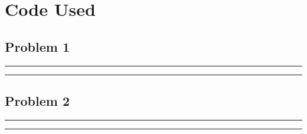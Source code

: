 \documentclass[a4paper,12pt]{article}
\begin{document}
\newpage
\section*{Code Used}
\subsection*{Problem 1}
\rule{\textwidth}{4pt}
	
\rule{\textwidth}{4pt}

\newpage
\subsection*{Problem 2}
\rule{\textwidth}{4pt}
	
\rule{\textwidth}{4pt}
\end{document}
